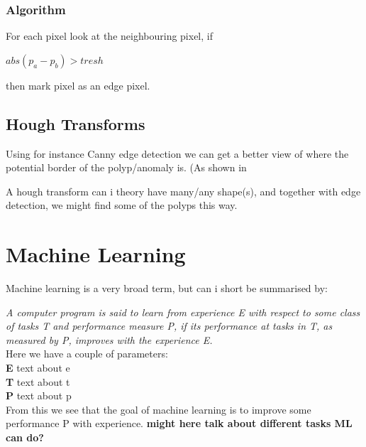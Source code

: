 	    \subsubsection{Algorithm}
	      For each pixel look at the neighbouring pixel, if \\
	      
	      \begin{centering} 
		$ abs(p_a - p_b)>tresh $\\ 
	      \end{centering}
	      
	      then mark pixel as an edge pixel. \\
	      
	  \subsection{Hough Transforms}
	    Using for instance Canny edge detection %
	    we can get a better view of where the potential border of the polyp/anomaly is. (As shown in %
	    
	    A hough transform can i theory have many/any shape(s), and together with edge detection, we might find some of the polyps this way.
	    
	    
	  
	  
	\section{Machine Learning}
	Machine learning is a very broad term, but can i short be summarised by:\\
	\vspace{10px}
	
	\textit{ A computer program is said to learn from experience E with respect to 
	some class of tasks T and performance measure P, if its performance at
	tasks in T, as measured by P, improves with the experience E. } 
	\cite{MitchellTomM1997Ml}\\
	
	\vspace{10px}
	Here we have a couple of parameters:\\
	\textbf{E} text about e\\
	\textbf{T} text about t\\
	\textbf{P} text about p\\
	
	From this we see that the goal of machine learning is to improve some performance P with experience.
	\textbf{might here talk about different tasks ML can do?}
	
